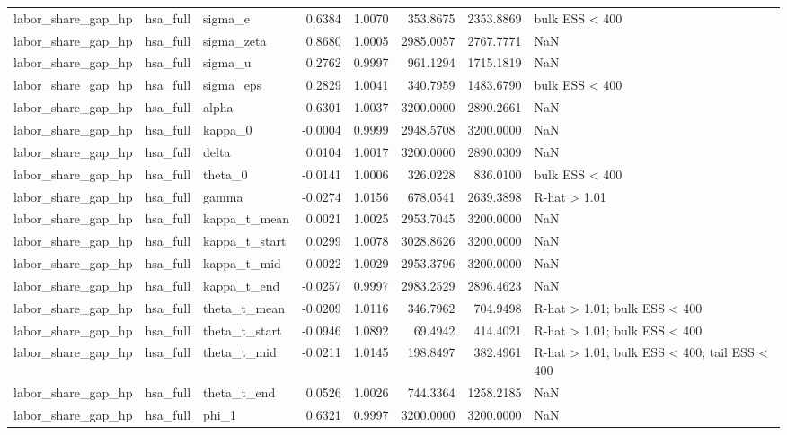 \begin{tabular}{lllrrrrl}
labor\_share\_gap\_hp & hsa\_full & sigma\_e & 0.6384 & 1.0070 & 353.8675 & 2353.8869 & bulk ESS < 400 \\
labor\_share\_gap\_hp & hsa\_full & sigma\_zeta & 0.8680 & 1.0005 & 2985.0057 & 2767.7771 & NaN \\
labor\_share\_gap\_hp & hsa\_full & sigma\_u & 0.2762 & 0.9997 & 961.1294 & 1715.1819 & NaN \\
labor\_share\_gap\_hp & hsa\_full & sigma\_eps & 0.2829 & 1.0041 & 340.7959 & 1483.6790 & bulk ESS < 400 \\
labor\_share\_gap\_hp & hsa\_full & alpha & 0.6301 & 1.0037 & 3200.0000 & 2890.2661 & NaN \\
labor\_share\_gap\_hp & hsa\_full & kappa\_0 & -0.0004 & 0.9999 & 2948.5708 & 3200.0000 & NaN \\
labor\_share\_gap\_hp & hsa\_full & delta & 0.0104 & 1.0017 & 3200.0000 & 2890.0309 & NaN \\
labor\_share\_gap\_hp & hsa\_full & theta\_0 & -0.0141 & 1.0006 & 326.0228 & 836.0100 & bulk ESS < 400 \\
labor\_share\_gap\_hp & hsa\_full & gamma & -0.0274 & 1.0156 & 678.0541 & 2639.3898 & R-hat > 1.01 \\
labor\_share\_gap\_hp & hsa\_full & kappa\_t\_mean & 0.0021 & 1.0025 & 2953.7045 & 3200.0000 & NaN \\
labor\_share\_gap\_hp & hsa\_full & kappa\_t\_start & 0.0299 & 1.0078 & 3028.8626 & 3200.0000 & NaN \\
labor\_share\_gap\_hp & hsa\_full & kappa\_t\_mid & 0.0022 & 1.0029 & 2953.3796 & 3200.0000 & NaN \\
labor\_share\_gap\_hp & hsa\_full & kappa\_t\_end & -0.0257 & 0.9997 & 2983.2529 & 2896.4623 & NaN \\
labor\_share\_gap\_hp & hsa\_full & theta\_t\_mean & -0.0209 & 1.0116 & 346.7962 & 704.9498 & R-hat > 1.01; bulk ESS < 400 \\
labor\_share\_gap\_hp & hsa\_full & theta\_t\_start & -0.0946 & 1.0892 & 69.4942 & 414.4021 & R-hat > 1.01; bulk ESS < 400 \\
labor\_share\_gap\_hp & hsa\_full & theta\_t\_mid & -0.0211 & 1.0145 & 198.8497 & 382.4961 & R-hat > 1.01; bulk ESS < 400; tail ESS < 400 \\
labor\_share\_gap\_hp & hsa\_full & theta\_t\_end & 0.0526 & 1.0026 & 744.3364 & 1258.2185 & NaN \\
labor\_share\_gap\_hp & hsa\_full & phi\_1 & 0.6321 & 0.9997 & 3200.0000 & 3200.0000 & NaN \\

\end{tabular}
